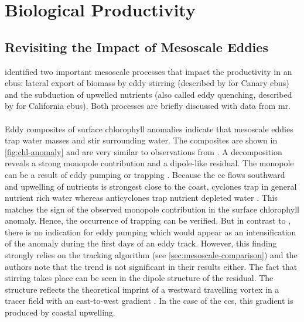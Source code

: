 \section{Biological Productivity}\label{sec:npp}

\subsection{Revisiting the Impact of Mesoscale Eddies}\label{sec:npp-mechanisms}

\Textcite{mcgilli-2016-meso-review} identified two important mesoscale processes that impact the productivity in an \ac{ebus}: lateral export of biomass by eddy stirring (described by \textcite{rossi-2008-stirring} for Canary \ac{ebus}) and the subduction of upwelled nutrients (also called eddy quenching, described by \textcite{gruber-2011-eddy-red} for California \ac{ebus}). Both processes are briefly discussed with data from \ac{mr}.\\
\\
Eddy composites of surface chlorophyll anomalies indicate that mesoscale eddies trap water masses and stir surrounding water. The composites are shown in \autoref{fig:chl-anomaly} and are very similar to observations from \textcite[see their Figure 9d]{gaube-2014-observations-mesoeddies}. A decomposition reveals a strong monopole contribution and a dipole-like residual. The monopole can be a result of eddy pumping or trapping \autocite{gaube-2014-observations-mesoeddies}. Because the \ac{cc} flows southward and upwelling of nutrients is strongest close to the coast, cyclones trap in general nutrient rich water whereas anticyclones trap nutrient depleted water \autocite{nagai-2015-dom-role-meso}. This matches the sign of the observed monopole contribution in the surface chlorophyll anomaly. Hence, the occurrence of trapping can be verified. But in contrast to \textcite{gaube-2014-observations-mesoeddies}, there is no indication for eddy pumping which would appear as an intensification of the anomaly during the first days of an eddy track. However, this finding strongly relies on the tracking algorithm (see \autoref{sec:mesoscale-comparison}) and the authors note that the trend is not significant in their results either. The fact that stirring takes place can be seen in the dipole structure of the residual. The structure reflects the theoretical imprint of a westward travelling vortex in a tracer field with an east-to-west gradient \autocite[see their Figure 3]{chelton-2011-surfacechl}. In the case of the \ac{ccs}, this gradient is produced by coastal upwelling.\\
